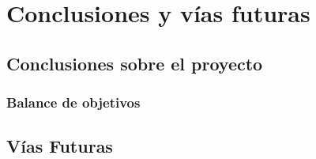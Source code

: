 \section{Conclusiones y vías futuras}

\subsection{Conclusiones sobre el proyecto}

\subsubsection*{Balance de objetivos}

\subsection{Vías Futuras}
